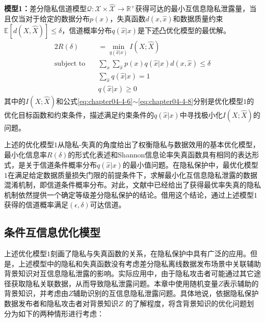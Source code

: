 \textbf{模型1：}差分隐私信道模型$\mathcal{Q}:\mathcal{X}\times \mathcal{\hat{X}}\rightarrow \mathbb{R}^{+}$获得可达的最小互信息隐私泄露量，当且仅当对于给定的数据分布$p(x)$，失真函数$d(x,\hat{x})$和数据质量约束$\mathbb{E}[d(X,\hat{X})]\leq \delta$，信道概率分布$q(\hat{x}|x)$是下述凸优化模型的最优解。
\begin{alignat}{2}
	R(\delta) & =\min_{q(\hat{x}|x)}I(X;\hat{X}) \nonumber \\
	\mbox{subject to} \quad
	& \sum_{x}\sum_{\hat{x}}p(x)q(\hat{x}|x)d(x,\hat{x})\leq  \delta \label{eq:chapter04-4-6}\\
	& \sum_{\hat{x}}q(\hat{x}|x)=1 \\
	& q(\hat{x}|x) \geq 0\label{eq:chapter04-4-8}
\end{alignat}
其中的$I(X;\hat{X})$和公式\ref{eq:chapter04-4-6}$\sim$\ref{eq:chapter04-4-8}分别是优化模型$1$的优化目标函数和约束条件，描述满足约束条件的$q(\hat{x}|x)$中寻找极小化$I(X;\hat{X})$的问题。

上述的优化模型$1$从隐私-失真的角度\cite{wang2016on}给出了权衡隐私与数据效用的基本优化模型，最小化信息率$R(\delta)$的形式化表述和Shannon信息论率失真函数\cite{cover2006elements}具有相同的表达形式，是关于信道条件概率分布$q(\hat{x}|x)$的最小值问题。在隐私保护中，最优化模型$1$在满足给定数据质量损失门限的前提条件下，求解最小化互信息隐私泄露的数据混淆机制，即信道条件概率分布。对此，文献中已经给出了获得最优率失真的隐私机制依然提供一个确定等级差分隐私保护的结论。借用这个结论，通过上述模型$1$获得的信道概率满足$(\epsilon,\delta)$可达信道。
\subsection{条件互信息优化模型}\label{subsec:chapter-05-conditional-mioptimization}

上述优化模型$1$刻画了隐私与失真函数的关系，在隐私保护中具有广泛的应用\cite{wang2016on,sarwate2014a,mir2012information}。但是，上述模型中的隐私和失真函数没有考虑差分隐私离线数据发布场景中关联辅助背景知识对互信息隐私泄露的影响。实际应用中，由于隐私攻击者可能通过其它途径获取隐私关联数据，从而导致隐私泄露问题。本章中使用随机变量$Z$表示辅助的背景知识，并考虑由$Z$辅助识别的互信息隐私泄露问题。具体地说，依据隐私保护数据发布者和隐私攻击者对背景知识$Z$
的了解程度，将含背景知识的优化问题划分为如下的两种情形进行考虑：

